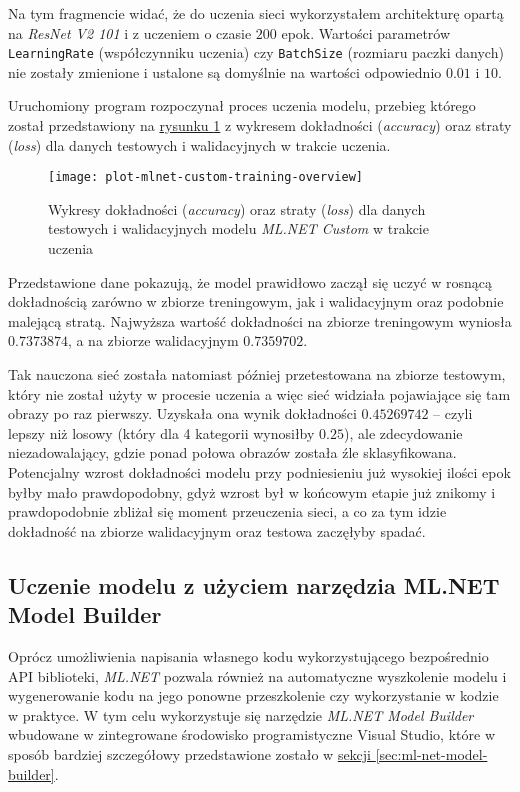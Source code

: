 Na tym fragmencie widać, że do uczenia sieci wykorzystałem architekturę opartą na \emph{ResNet V2 101} i z uczeniem o czasie $200$ epok.
Wartości parametrów \lstinline{LearningRate} (współczynniku uczenia) czy \lstinline{BatchSize} (rozmiaru paczki danych) nie zostały zmienione i ustalone są domyślnie na wartości odpowiednio $0.01$ i $10$.

Uruchomiony program rozpoczynał proces uczenia modelu, przebieg którego został przedstawiony na \hyperref[fig:plot-mlnet-custom-training-overview]{rysunku \ref*{fig:plot-mlnet-custom-training-overview}} z wykresem dokładności (\emph{accuracy}) oraz straty (\emph{loss}) dla danych testowych i walidacyjnych w trakcie uczenia.

\begin{figure}[ht]
  \texttt{[image: plot-mlnet-custom-training-overview]}
  \caption[Wykresy statystyk modelu ML.NET Custom w trakcie uczenia]{Wykresy dokładności (\emph{accuracy}) oraz straty (\emph{loss}) dla danych testowych i walidacyjnych modelu \emph{ML.NET Custom} w trakcie uczenia}
  \label{fig:plot-mlnet-custom-training-overview}
\end{figure}

Przedstawione dane pokazują, że model prawidłowo zaczął się uczyć w rosnącą dokładnością zarówno w zbiorze treningowym, jak i walidacyjnym oraz podobnie malejącą stratą.
Najwyższa wartość dokładności na zbiorze treningowym wyniosła $0.7373874$, a na zbiorze walidacyjnym $0.7359702$.

Tak nauczona sieć została natomiast później przetestowana na zbiorze testowym, który nie został użyty w procesie uczenia a więc sieć widziała pojawiające się tam obrazy po raz pierwszy.
Uzyskała ona wynik dokładności $0.45269742$ -- czyli lepszy niż losowy (który dla 4 kategorii wynosiłby $0.25$), ale zdecydowanie niezadowalający, gdzie ponad połowa obrazów została źle sklasyfikowana.
Potencjalny wzrost dokładności modelu przy podniesieniu już wysokiej ilości epok byłby mało prawdopodobny, gdyż wzrost był w końcowym etapie już znikomy i prawdopodobnie zbliżał się moment przeuczenia sieci, a co za tym idzie dokładność na zbiorze walidacyjnym oraz testowa zaczęłyby spadać.

\subsection{Uczenie modelu z użyciem narzędzia ML.NET Model Builder}

Oprócz umożliwienia napisania własnego kodu wykorzystującego bezpośrednio API biblioteki, \emph{ML.NET} pozwala również na automatyczne wyszkolenie modelu i wygenerowanie kodu na jego ponowne przeszkolenie czy wykorzystanie w kodzie w praktyce.
W tym celu wykorzystuje się narzędzie \emph{ML.NET Model Builder} wbudowane w zintegrowane środowisko programistyczne Visual Studio, które w sposób bardziej szczegółowy przedstawione zostało w \hyperref[sec:ml-net-model-builder]{sekcji \ref*{sec:ml-net-model-builder}}.

